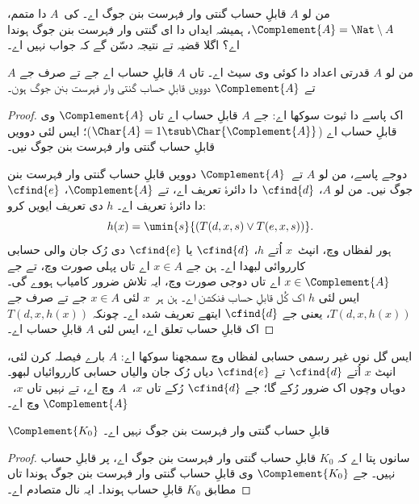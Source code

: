 \documentclass[../../../include/open-logic-section]{subfiles}
\begin{document}

من لو $A$ قابلِ حساب گنتی وار فہرست بنن جوگ اے۔
کی~$A$ دا متمم،
$\Complement{A} = \Nat \setminus A$،
ہمیشہ ایداں دا ای گنتی وار فہرست بنن جوگ
ہوندا اے؟ اگلا قضیہ تے نتیجہ دسّن گے
کہ جواب نہیں اے۔

\begin{thm}
من لو $A$ قدرتی اعداد دا کوئی وی سیٹ اے۔
تاں $A$ قابلِ حساب اے جے تے صرف جے
$A$ تے $\Complement{A}$ دوویں قابلِ حساب
گنتی وار فہرست بنن جوگ ہون۔
\end{thm}

\begin{proof}
اک پاسے دا ثبوت سوکھا اے: جے $A$ قابلِ حساب
اے تاں $\Complement{A}$ وی قابلِ حساب اے
($\Char{A} = 1 \tsub
\Char{\Complement{A}}$)؛ ایس لئی دوویں
قابلِ حساب گنتی وار فہرست بنن جوگ نیں۔

دوجے پاسے، من لو $A$ تے~$\Complement{A}$
دوویں قابلِ حساب گنتی وار فہرست بنن جوگ نیں۔
من لو $A$، $\cfind{d}$ دا دائرۂ تعریف اے،
تے $\Complement{A}$، $\cfind{e}$ دا دائرۂ
تعریف اے۔ $h$ دی تعریف ایویں کرو:
\[
h(x) = \umin{s}{(T(d,x,s) \lor T(e,x,s))}.
\]
ہور لفظاں وچ، انپٹ~$x$ اُتے $h$،
$\cfind{d}$ یا $\cfind{e}$ دی رُک جان والی
حسابی کارروائی لبھدا اے۔ ہن جے $x \in A$
اے تاں پہلی صورت وچ، تے جے $x \in
\Complement{A}$ اے تاں دوجی صورت وچ،
ایہ تلاش ضرور کامیاب ہووے گی۔ ایس لئی
$h$ اک کُل قابلِ حساب فنکشن اے۔
ہن ہر~$x$ لئی $x \in A$ جے تے صرف
جے $T(d, x, h(x))$، یعنی جے
$\cfind{d}$ ایتھے تعریف شدہ اے۔
چونکہ $T(d, x, h(x))$ اک قابلِ حساب
تعلق اے، ایس لئی $A$ قابلِ حساب اے۔
\end{proof}

\begin{explain}
ایس گل نوں غیر رسمی حسابی لفظاں وچ سمجھنا
سوکھا اے: $A$ بارے فیصلہ کرن لئی،
انپٹ $x$ اُتے $\cfind{d}$ تے $\cfind{e}$
دیاں رُک جان والیاں حسابی کارروائیاں
لبھو۔ دوہاں وچوں اک ضرور رُکے گا؛
جے $\cfind{d}$ رُکے تاں $x$،~$A$
وچ اے، تے نہیں تاں $x$،~$\Complement{A}$
وچ اے۔
\end{explain}

\begin{cor}
$\Complement{K_0}$ قابلِ حساب گنتی وار
فہرست بنن جوگ نہیں اے۔
\end{cor}

\begin{proof}
سانوں پتا اے کہ $K_0$ قابلِ حساب گنتی وار
فہرست بنن جوگ اے، پر قابلِ حساب نہیں۔
جے $\Complement{K_0}$ وی قابلِ حساب
گنتی وار فہرست بنن جوگ ہوندا تاں
 مطابق $K_0$ قابلِ
حساب ہوندا۔ ایہ 
نال متصادم اے۔
\end{proof}
\end{document}
